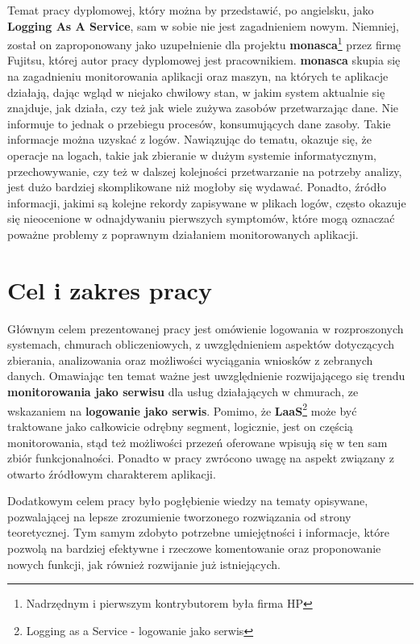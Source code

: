 Temat pracy dyplomowej, który można by przedstawić, po angielsku, jako \textbf{Logging As A Service}, sam w sobie nie jest zagadnieniem
nowym. Niemniej, został on zaproponowany jako uzupełnienie dla projektu \textbf{monasca}\footnote{Nadrzędnym i pierwszym kontrybutorem była firma HP} przez
firmę Fujitsu, której autor pracy dyplomowej jest pracownikiem. 
\textbf{monasca} skupia się na zagadnieniu monitorowania aplikacji oraz maszyn, na których te aplikacje działają, dając wgląd w niejako
chwilowy stan, w jakim system aktualnie się znajduje, jak działa, czy też jak wiele zużywa zasobów przetwarzając dane. Nie informuje to jednak o 
przebiegu procesów, konsumujących dane zasoby. Takie informacje można uzyskać z logów. Nawiązując do tematu, okazuje się, że operacje na logach, takie jak 
zbieranie w dużym systemie informatycznym, przechowywanie, czy też w dalszej kolejności przetwarzanie na potrzeby analizy, jest dużo bardziej 
skomplikowane niż mogłoby się wydawać. Ponadto, źródło informacji, jakimi są kolejne rekordy zapisywane w plikach logów, często okazuje się nieocenione w 
odnajdywaniu pierwszych symptomów, które mogą oznaczać poważne problemy z poprawnym działaniem monitorowanych aplikacji.

\section{Cel i zakres pracy}

Głównym celem prezentowanej pracy jest omówienie logowania w rozproszonych systemach, chmurach obliczeniowych, 
z uwzględnieniem aspektów dotyczących zbierania, analizowania oraz możliwości wyciągania wniosków z zebranych danych.
Omawiając ten temat ważne jest uwzględnienie rozwijającego się trendu \textbf{monitorowania jako serwisu} dla usług 
działających w chmurach, ze wskazaniem na \textbf{logowanie jako serwis}. Pomimo, że \textbf{LaaS}\footnote{Logging as a 
Service - logowanie jako serwis} może być traktowane jako całkowicie odrębny segment, logicznie, jest on częścią 
monitorowania, stąd też możliwości przezeń oferowane wpisują się w ten sam zbiór funkcjonalności. 
Ponadto w pracy zwrócono uwagę na aspekt związany z otwarto źródłowym charakterem aplikacji.

Dodatkowym celem pracy było pogłębienie wiedzy na tematy opisywane, pozwalającej na lepsze zrozumienie tworzonego rozwiązania od strony teoretycznej. Tym samym zdobyto
potrzebne umiejętności i informacje, które pozwolą na bardziej efektywne i rzeczowe komentowanie oraz proponowanie nowych funkcji, jak również rozwijanie już istniejących.  


